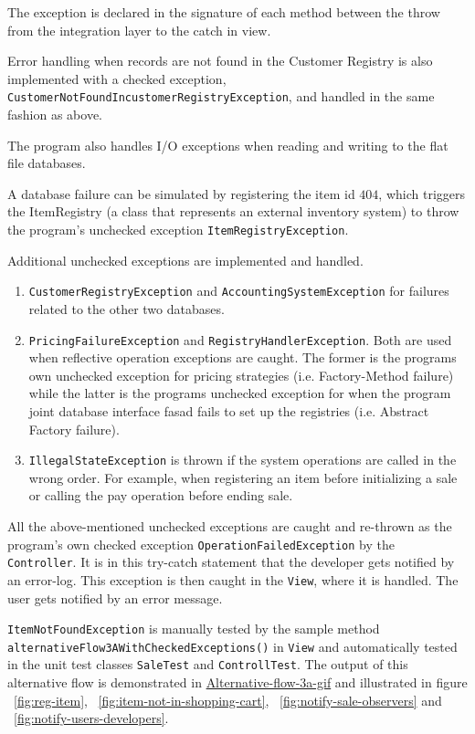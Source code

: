 \documentclass[a4paper]{scrreprt}
\begin{document}
The exception is declared in the signature of each method between the throw from the
integration layer %
to the catch in view.

Error handling when records are not found in the Customer Registry is
also implemented with
a checked exception, \texttt{CustomerNotFoundIncustomerRegistryException},
and handled in the same fashion as above.

The program also handles I/O exceptions when reading and writing to the flat file databases.

A database failure can be simulated by registering the item id $404$,
which triggers the ItemRegistry (a class that represents an external inventory system)
to throw the program's unchecked exception \texttt{ItemRegistryException}.

Additional unchecked exceptions are implemented and handled.
\begin{enumerate}
    \item \texttt{CustomerRegistryException} and \texttt{AccountingSystemException} for
    failures related to the other two databases.
    \item \texttt{PricingFailureException} and \texttt{RegistryHandlerException}.
    Both are used when reflective operation exceptions are caught.
    The former is the programs own unchecked exception for pricing strategies
    (i.e. Factory-Method failure) while the latter
    is the programs unchecked exception for
    when the program joint database interface fasad fails to set up the registries
    (i.e. Abstract Factory failure).
    \item \texttt{IllegalStateException} is thrown if the
    system operations are called in the wrong order.
    For example, when registering an item before initializing a sale
    or calling the pay operation before ending sale.
\end{enumerate}

All the above-mentioned unchecked exceptions %
are caught and re-thrown as the program's own checked
exception \texttt{OperationFailedException}
by the \verb|Controller|.
It is in this try-catch statement that the developer gets notified by an error-log.
This exception is then caught in the \verb|View|, where it is
handled.
The user gets notified by an error message.

\texttt{ItemNotFoundException} is manually tested by the sample method
\texttt{alternativeFlow3AWithCheckedExceptions()}
in \verb|View|
and automatically tested in the unit test classes \verb|SaleTest| and \verb|ControllTest|.
The output of this alternative flow is demonstrated in
\href{https://github.com/VincentFerrigan/kth-iv1350-object-oriented-design#alternative-flow---checked-exception-business-logic}{Alternative-flow-3a-gif}
and illustrated in
figure ~\ref{fig:reg-item}, ~\ref{fig:item-not-in-shopping-cart}, ~\ref{fig:notify-sale-observers} and ~\ref{fig:notify-users-developers}.
\end{document}
